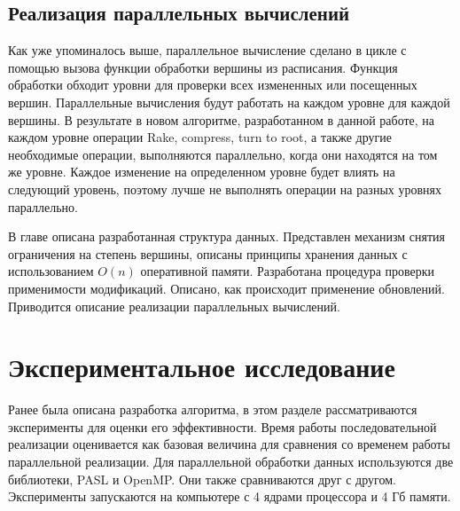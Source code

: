 \documentclass[specification,annotation]{itmo-student-thesis}
\begin{document}
\section{Реализация параллельных вычислений}

Как уже упоминалось выше, параллельное вычисление сделано в цикле с помощью вызова функции обработки вершины из расписания. Функция обработки обходит уровни для проверки всех измененных или посещенных вершин. 
Параллельные вычисления будут работать на каждом уровне для каждой вершины. В 
результате в новом алгоритме, разработанном в данной работе, на каждом уровне операции Rake, 
compress, turn to root, а также другие необходимые операции, выполняются параллельно, 
когда они находятся на том же уровне. Каждое изменение на определенном уровне будет влиять на следующий уровень, поэтому лучше не выполнять операции на разных уровнях параллельно.


\chapterconclusion

В главе описана разработанная структура данных. Представлен механизм снятия ограничения на степень вершины, описаны принципы хранения данных с использованием $O(n)$ оперативной памяти. 
Разработана процедура проверки применимости модификаций. Описано, как происходит применение обновлений. Приводится описание реализации параллельных вычислений. 

\chapter{Экспериментальное исследование}

Ранее была описана разработка алгоритма, в этом разделе рассматриваются эксперименты для оценки его эффективности. Время работы последовательной реализации оценивается как базовая величина для сравнения со временем работы параллельной реализации. Для параллельной обработки данных используются две библиотеки, PASL и OpenMP. Они также сравниваются друг с другом. Эксперименты запускаются на компьютере с 4 ядрами процессора и 4 Гб памяти.
\end{document}
